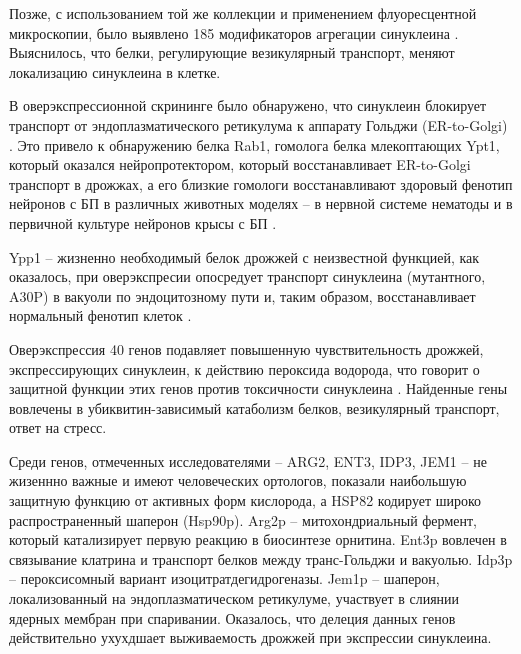  Позже, с использованием той же коллекции и применением флуоресцентной микроскопии, было выявлено 185 модификаторов агрегации синуклеина \cite{zabrocki_phosphorylation_2008}. Выяснилось, что белки, регулирующие везикулярный транспорт, меняют локализацию синуклеина в клетке.

В оверэкспрессионной скрининге было обнаружено, что синуклеин блокирует транспорт от эндоплазматического ретикулума к аппарату Гольджи (ER-to-Golgi) \cite{cooper_-synuclein_2006}. Это привело к обнаружению белка Rab1, гомолога белка млекоптающих Ypt1, который оказался нейропротектором, который восстанавливает ER-to-Golgi транспорт в дрожжах, а его близкие гомологи восстанавливают здоровый фенотип нейронов с БП в различных животных моделях -- в нервной системе нематоды и в первичной культуре нейронов крысы с БП \cite{gitler_parkinsons_2008}.

Ypp1 -- жизненно необходимый белок дрожжей с неизвестной функцией,  как оказалось, при оверэкспресии опосредует транспорт синуклеина (мутантного, A30P) в вакуоли по эндоцитозному пути и, таким образом, восстанавливает нормальный фенотип клеток \cite{flower_ygr198w_2007}.


Оверэкспрессия 40 генов подавляет повышенную чувствительность дрожжей, экспрессирующих синуклеин, к действию пероксида водорода, что говорит о защитной функции этих генов против токсичности синуклеина \cite{liang_novel_2008}. Найденные гены вовлечены в убиквитин-зависимый катаболизм белков, везикулярный транспорт, ответ на стресс. 

Среди генов, отмеченных исследователями -- ARG2, ENT3, IDP3, JEM1 -- не жизеннно важные и имеют человеческих ортологов, показали наибольшую защитную функцию от активных форм кислорода, а HSP82 кодирует широко распространенный шаперон (Hsp90p). 
	Arg2p -- митохондриальный фермент, который катализирует первую реакцию в биосинтезе орнитина. Ent3p вовлечен в связывание клатрина и транспорт белков между транс-Гольджи и вакуолью. Idp3p -- пероксисомный вариант изоцитратдегидрогеназы. Jem1p -- шаперон, локализованный на эндоплазматическом ретикулуме, участвует в слиянии ядерных мембран при спаривании. Оказалось, что делеция данных генов действительно ухухдшает выживаемость дрожжей при экспрессии синуклеина.


